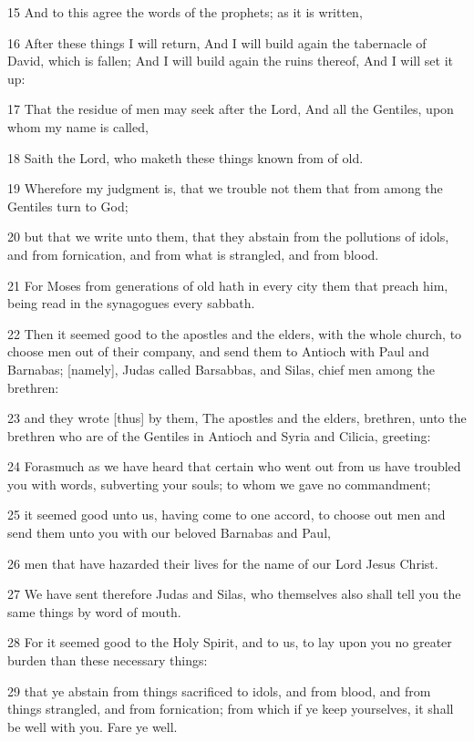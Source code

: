 \par 15 And to this agree the words of the prophets; as it is written,
\par 16 After these things I will return, And I will build again the tabernacle of David, which is fallen; And I will build again the ruins thereof, And I will set it up:
\par 17 That the residue of men may seek after the Lord, And all the Gentiles, upon whom my name is called,
\par 18 Saith the Lord, who maketh these things known from of old.
\par 19 Wherefore my judgment is, that we trouble not them that from among the Gentiles turn to God;
\par 20 but that we write unto them, that they abstain from the pollutions of idols, and from fornication, and from what is strangled, and from blood.
\par 21 For Moses from generations of old hath in every city them that preach him, being read in the synagogues every sabbath.
\par 22 Then it seemed good to the apostles and the elders, with the whole church, to choose men out of their company, and send them to Antioch with Paul and Barnabas; [namely], Judas called Barsabbas, and Silas, chief men among the brethren:
\par 23 and they wrote [thus] by them, The apostles and the elders, brethren, unto the brethren who are of the Gentiles in Antioch and Syria and Cilicia, greeting:
\par 24 Forasmuch as we have heard that certain who went out from us have troubled you with words, subverting your souls; to whom we gave no commandment;
\par 25 it seemed good unto us, having come to one accord, to choose out men and send them unto you with our beloved Barnabas and Paul,
\par 26 men that have hazarded their lives for the name of our Lord Jesus Christ.
\par 27 We have sent therefore Judas and Silas, who themselves also shall tell you the same things by word of mouth.
\par 28 For it seemed good to the Holy Spirit, and to us, to lay upon you no greater burden than these necessary things:
\par 29 that ye abstain from things sacrificed to idols, and from blood, and from things strangled, and from fornication; from which if ye keep yourselves, it shall be well with you. Fare ye well.
